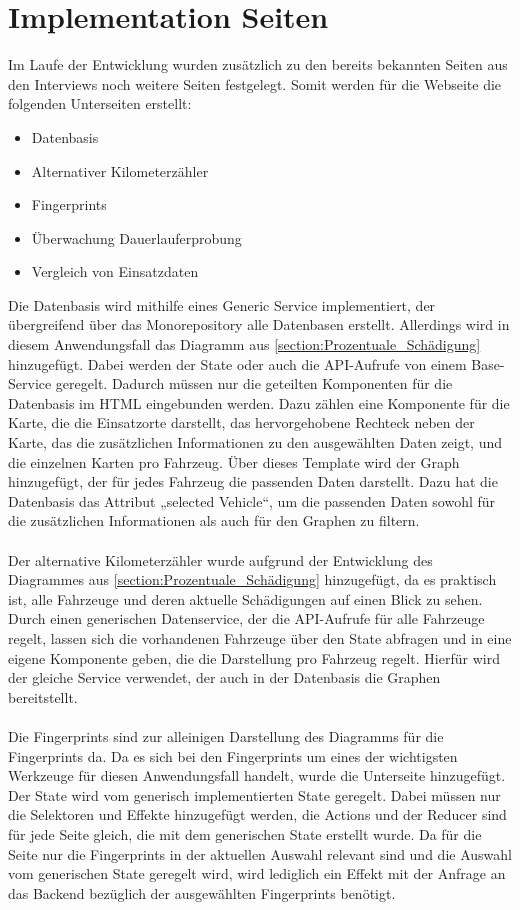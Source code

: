 \section{Implementation Seiten}
Im Laufe der Entwicklung wurden zusätzlich zu den bereits bekannten Seiten aus den Interviews noch weitere Seiten festgelegt. Somit werden für die Webseite die folgenden Unterseiten erstellt:
\begin{itemize}
    \item Datenbasis
    \item Alternativer Kilometerzähler
    \item Fingerprints
    \item Überwachung Dauerlauferprobung
    \item Vergleich von Einsatzdaten
\end{itemize}
Die Datenbasis wird mithilfe eines Generic Service implementiert, der übergreifend über das Monorepository alle Datenbasen erstellt. Allerdings wird in diesem Anwendungsfall das Diagramm aus \ref{section:Prozentuale_Schädigung} hinzugefügt. Dabei werden der State oder auch die API-Aufrufe von einem Base-Service geregelt. Dadurch müssen nur die geteilten Komponenten für die Datenbasis im HTML eingebunden werden. Dazu  zählen eine Komponente für die Karte, die die Einsatzorte darstellt, das hervorgehobene Rechteck neben der Karte, das die zusätzlichen Informationen zu den ausgewählten Daten zeigt, und die einzelnen Karten pro Fahrzeug. Über dieses Template wird der Graph hinzugefügt, der für jedes Fahrzeug die passenden Daten darstellt. Dazu hat die Datenbasis das Attribut „selected Vehicle“, um die passenden Daten sowohl für die zusätzlichen Informationen als auch für den Graphen zu filtern.\\\\ Der alternative Kilometerzähler wurde aufgrund der Entwicklung des Diagrammes aus \ref{section:Prozentuale_Schädigung} hinzugefügt, da es praktisch ist, alle Fahrzeuge und deren aktuelle Schädigungen auf einen Blick zu sehen. Durch einen generischen Datenservice, der die API-Aufrufe für alle Fahrzeuge regelt, lassen sich die vorhandenen Fahrzeuge über den State abfragen und in eine eigene Komponente geben, die die Darstellung pro Fahrzeug regelt. Hierfür wird der gleiche Service verwendet, der auch in der Datenbasis die Graphen bereitstellt.\\\\ Die Fingerprints sind zur alleinigen Darstellung des Diagramms für die Fingerprints da. Da es sich bei den Fingerprints um eines der wichtigsten Werkzeuge für diesen Anwendungsfall handelt, wurde die Unterseite hinzugefügt. Der State wird vom generisch implementierten State geregelt. Dabei müssen nur die Selektoren und Effekte hinzugefügt werden, die Actions und der Reducer sind für jede Seite gleich, die mit dem generischen State erstellt wurde. Da für die Seite nur die Fingerprints in der aktuellen Auswahl relevant sind und die Auswahl vom generischen State geregelt wird, wird lediglich ein Effekt mit der Anfrage an das Backend bezüglich der ausgewählten Fingerprints benötigt.\\\\
